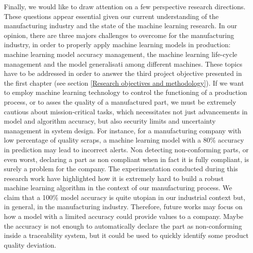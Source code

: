 Finally, we would like to draw attention on a few perspective research directions. These questions appear essential given our current understanding of the manufacturing industry and the state of the machine learning research. In our opinion, there are three majors challenges to overcome for the manufacturing industry, in order to properly apply machine learning models in production: machine learning model accuracy management, the machine learning life-cycle management and the model generalisati among different machines. These topics have to be addressed in order to answer the third project objective presented in the first chapter (see section \ref{Research objectives and methodology}).   
If we want to employ machine learning technology to control the functioning of a production process, or to asses the quality of a manufactured part, we must be extremely cautious about mission-critical tasks, which necessitates not just advancements in model and algorithm accuracy, but also security limits and uncertainty management in system design. For instance, for a manufacturing company with low percentage of quality scraps, a machine learning model with a 80\% accuracy in prediction may lead to incorrect alerts. Non detecting non-conforming parts, or even worst, declaring a part as non compliant when in fact it is fully compliant, is surely a problem for the company. The experimentation conducted during this research work have highlighted how it is extremely hard to build a robust machine learning algorithm in the context of our manufacturing process. We claim that a 100\% model accuracy is quite utopian in our industrial context but, in general, in the manufacturing industry. Therefore, future works may focus on how a model with a limited accuracy could provide values to a company. Maybe the accuracy is not enough to automatically declare the part as non-conforming inside a traceability system, but it could be used to quickly identify some product quality deviation.

